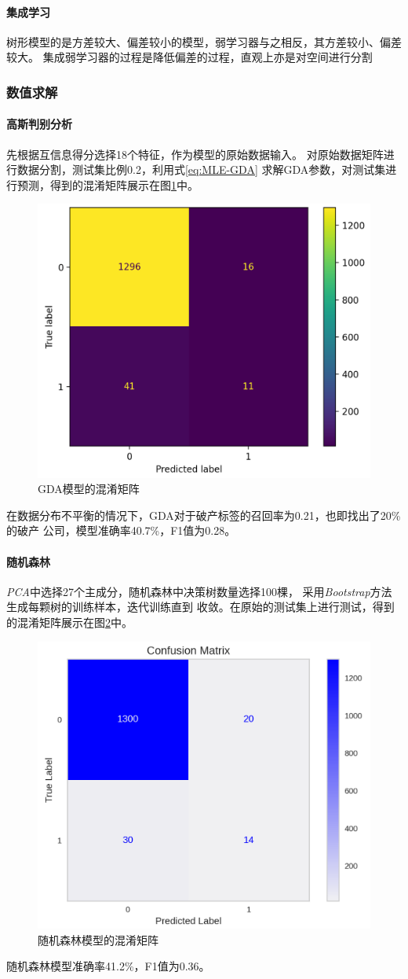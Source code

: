 \paragraph{集成学习}
树形模型的是方差较大、偏差较小的模型，弱学习器与之相反，其方差较小、偏差较大。
集成弱学习器的过程是降低偏差的过程，直观上亦是对空间进行分割

\subsubsection{数值求解}
\paragraph{高斯判别分析}
先根据互信息得分选择18个特征，作为模型的原始数据输入。
对原始数据矩阵进行数据分割，测试集比例0.2，利用式\ref{eq:MLE-GDA}
求解GDA参数，对测试集进行预测，得到的混淆矩阵展示在图\ref{fig:confusion-matrix-GDA}中。
\begin{figure}[ht]
    \centering
    \includegraphics[width=.5\textwidth]{images/confusion_matrix_GDA.png}
    \caption{GDA模型的混淆矩阵}
    \label{fig:confusion-matrix-GDA}
\end{figure}
在数据分布不平衡的情况下，GDA对于破产标签的召回率为0.21，也即找出了20\%的破产
公司，模型准确率40.7\%，F1值为0.28。

\paragraph{随机森林}
\textit{PCA}中选择27个主成分，随机森林中决策树数量选择100棵，
采用\textit{Bootstrap}方法生成每颗树的训练样本，迭代训练直到
收敛。在原始的测试集上进行测试，得到的混淆矩阵展示在图\ref{fig:confusion-matrix-random-forest}中。
\begin{figure}[ht]
    \centering
    \includegraphics[width=.5\textwidth]{images/random_forest_confusion_matrix_unbalanced.png}
    \caption{随机森林模型的混淆矩阵}
    \label{fig:confusion-matrix-random-forest}
\end{figure}
随机森林模型准确率41.2\%，F1值为0.36。